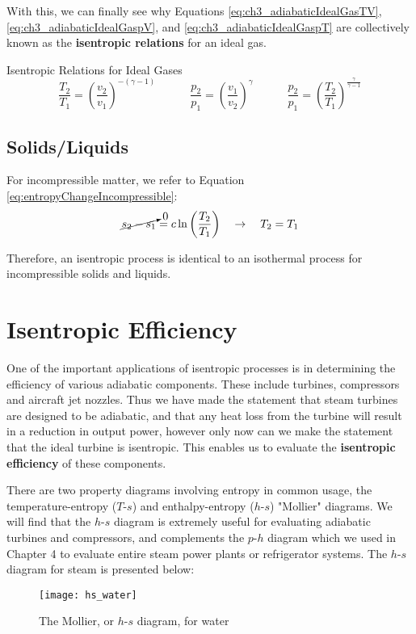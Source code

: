 With this, we can finally see why Equations \ref{eq:ch3_adiabaticIdealGasTV}, \ref {eq:ch3_adiabaticIdealGaspV}, and \ref{eq:ch3_adiabaticIdealGaspT} are collectively known as the {\bf isentropic relations} for an ideal gas.

\begin{quoteWithTitle}{Isentropic Relations for Ideal Gases}%
  \begin{equation*}
    \frac{T_2}{T_1} = \left(\frac{v_2}{v_1}\right)^{-(\gamma -1)} \quad\quad\quad
    \frac{p_2}{p_1} = \left(\frac{v_1}{v_2}\right)^{\gamma} \quad\quad\quad
    \frac{p_2}{p_1} = \left(\frac{T_2}{T_1}\right)^{\frac{\gamma}{\gamma -1}}
  \end{equation*}
\end{quoteWithTitle}


\subsection{Solids/Liquids}

For incompressible matter, we refer to Equation \ref{eq:entropyChangeIncompressible}: 
\begin{equation*}
  \cancelto{0}{s_2 - s_1} = c \ln \left(\frac{T_2}{T_1}\right) \quad\rightarrow\quad T_2 = T_1
\end{equation*}

Therefore, an isentropic process is identical to an isothermal process for incompressible solids and liquids.

\section{Isentropic Efficiency}
One of the important applications of isentropic processes is in determining the efficiency of various adiabatic components. These include turbines, compressors and aircraft jet nozzles. Thus we have made the statement that steam turbines are designed to be adiabatic, and that any heat loss from the turbine will result in a reduction in output power, however only now can we make the statement that the ideal turbine is isentropic. This enables us to evaluate the {\bf isentropic efficiency} of these components.

There are two property diagrams involving entropy in common usage, the temperature-entropy ($T$-$s$) and enthalpy-entropy ($h$-$s$) "Mollier" diagrams. We will find that the $h$-$s$ diagram is extremely useful for evaluating adiabatic turbines and compressors, and complements the $p$-$h$ diagram which we used in Chapter 4 to evaluate entire steam power plants or refrigerator systems. The $h$-$s$ diagram for steam is presented below:
\nopagebreak[4]%
\begin{figure}[H]
  \centering
  \texttt{[image: hs\_water]}
  \caption{The Mollier, or $h$-$s$ diagram, for water}
  \label{fig:hs_water}
\end{figure}
